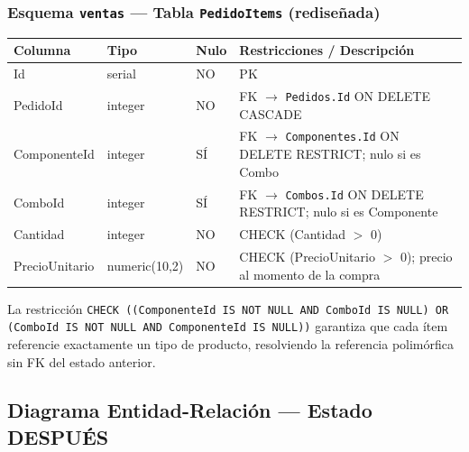 \subsubsection{Esquema \texttt{ventas} --- Tabla \texttt{PedidoItems} (redise\~nada)}

\begin{center}
\begin{tablaAPA}
\begin{tabular}{L{2.8cm} L{2.2cm} C{1.2cm} L{7.0cm}}
\toprule
\textbf{Columna} & \textbf{Tipo} & \textbf{Nulo} & \textbf{Restricciones / Descripci\'on} \\
\midrule
Id            & serial        & NO & PK \\
PedidoId      & integer       & NO & FK $\to$ \texttt{Pedidos.Id} ON DELETE CASCADE \\
ComponenteId  & integer       & S\'I & FK $\to$ \texttt{Componentes.Id} ON DELETE RESTRICT; nulo si es Combo \\
ComboId       & integer       & S\'I & FK $\to$ \texttt{Combos.Id} ON DELETE RESTRICT; nulo si es Componente \\
Cantidad      & integer       & NO & CHECK (Cantidad $>$ 0) \\
PrecioUnitario& numeric(10,2) & NO & CHECK (PrecioUnitario $>$ 0); precio al momento de la compra \\
\bottomrule
\end{tabular}
\end{tablaAPA}
\label{tab:dict-pedidoitems}
\end{center}

La restricci\'on \texttt{CHECK ((ComponenteId IS NOT NULL AND ComboId IS NULL) OR (ComboId IS NOT NULL AND ComponenteId IS NULL))} garantiza que cada \'item referencie exactamente un tipo de producto, resolviendo la referencia polim\'orfica sin FK del estado anterior.

\subsection{Diagrama Entidad-Relaci\'on --- Estado DESPU\'ES}


